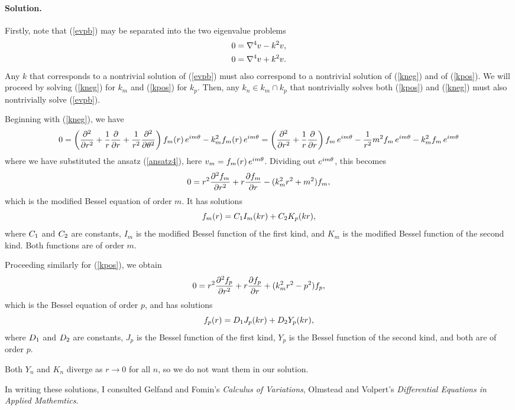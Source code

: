 \documentclass[11pt]{article}
\newcommand{\refeq}[1]{(\ref{#1})}
\newcommand{\beq}{\begin{equation*}}
\newcommand{\eeq}{\end{equation*}}
\newcommand{\beqn}{\begin{equation}}
\newcommand{\eeqn}{\end{equation}}
\newenvironment{solution}
{
    \paragraph{Solution.}
    \ignorespaces
}
{
}
\begin{document}
\begin{solution}
	Firstly, note that \refeq{evpb} may be separated into the two eigenvalue problems
	\begin{align}
		0 &= \nabla^4 v - k^2 v, \label{kneg} \\
		0 &= \nabla^4 v + k^2 v. \label{kpos}
	\end{align}
	Any $k$ that corresponds to a nontrivial solution of \refeq{evpb} must also correspond to a nontrivial solution of \refeq{kneg} and of \refeq{kpos}.  We will proceed by solving \refeq{kneg} for $k_m$ and \refeq{kpos} for $k_p$.  Then, any $k_n \in k_m \cap k_p$ that nontrivially solves both \refeq{kpos} and \refeq{kneg} must also nontrivially solve \refeq{evpb}.
	
	Beginning with \refeq{kneg}, we have
	\beq
		0 = \left( \pdv[2]{}{r} + \frac{1}{r} \pdv{}{r} + \frac{1}{r^2} \pdv[2]{}{\theta} \right) \fm(r) \, \eimt - \km^2 \fm(r) \, \eimt = \left( \pdv[2]{}{r} + \frac{1}{r} \pdv{}{r} \right) \fm \, \eimt - \frac{1}{r^2} m^2 \fm \, \eimt - \km^2 \fm \, \eimt
	\eeq
	where we have substituted the ansatz \refeq{ansatz4}, here $v_m = f_m(r) \, e^{im\theta}$.  Dividing out $e^{im\theta}$, this becomes
	\beqn \label{modbess}
		0 = r^2 \pdv[2]{\fm}{r} + r \pdv{\fm}{r} - (\km^2 r^2 + m^2) \fm,
	\eeqn
	which is the modified Bessel equation of order $m$.  It has solutions
	\beq
		\fm(r) = \Cq I_m(kr) + \Cw K_p(kr),
	\eeq
	where $C_1$ and $C_2$ are constants, $I_m$ is the modified Bessel function of the first kind, and $K_m$ is the modified Bessel function of the second kind.  Both functions are of order $m$.
	
	Proceeding similarly for \refeq{kpos}, we obtain
	\beqn \label{bess}
		0 = r^2 \pdv[2]{\fp}{r} + r \pdv{\fp}{r} + (\kp^2 r^2 - p^2) \fp,
	\eeqn
	which is the Bessel equation of order $p$, and has solutions
	\beq
		\fp(r) = \Dq J_p(kr) + \Dw Y_p(kr),
	\eeq
	where $D_1$ and $D_2$ are constants, $J_p$ is the Bessel function of the first kind, $Y_p$ is the Bessel function of the second kind, and both are of order $p$.

	Both $Y_n$ and $K_n$ diverge as $r \to 0$ for all $n$, so we do not want them in our solution.
\end{solution}



In writing these solutions, I consulted Gelfand and Fomin's \emph{Calculus of Variations}, Olmstead and Volpert's \emph{Differential Equations in Applied Mathemtics}.
\end{document}
